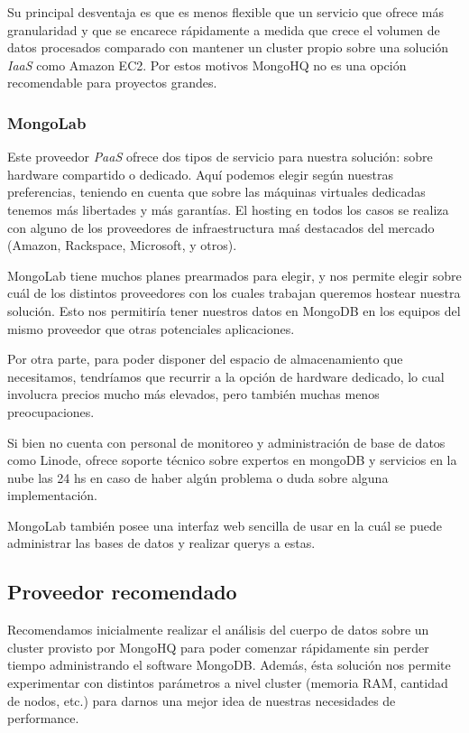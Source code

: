 \documentclass[a4paper,10pt,twoside]{article}
\begin{document}
Su principal desventaja es que es menos flexible que un servicio que ofrece más granularidad y que se encarece rápidamente a medida que crece el volumen de datos procesados comparado con mantener un cluster propio sobre una solución \emph{IaaS} como Amazon EC2. Por estos motivos MongoHQ no es una opción recomendable para proyectos grandes.


\subsubsection{MongoLab}

Este proveedor \emph{PaaS} ofrece dos tipos de servicio para nuestra solución: sobre hardware compartido o dedicado. Aquí podemos elegir según nuestras preferencias, teniendo en cuenta que sobre las máquinas virtuales dedicadas tenemos más libertades y más garantías. El hosting en todos los casos se realiza con alguno de los proveedores de infraestructura maś destacados del mercado (Amazon, Rackspace, Microsoft, y otros).

MongoLab tiene muchos planes prearmados para elegir, y nos permite elegir sobre cuál de los distintos proveedores con los cuales trabajan queremos hostear nuestra solución. Esto nos permitiría tener nuestros datos en MongoDB en los equipos del mismo proveedor que otras potenciales aplicaciones.

Por otra parte, para poder disponer del espacio de almacenamiento que necesitamos, tendríamos que recurrir a la opción de hardware dedicado, lo cual involucra precios mucho más elevados, pero también muchas menos preocupaciones.

Si bien no cuenta con personal de monitoreo y administración de base de datos como Linode, ofrece soporte técnico sobre expertos en mongoDB y servicios en la nube las 24 hs en caso de haber algún problema o duda sobre alguna implementación.

MongoLab también posee una interfaz web sencilla de usar en la cuál se puede administrar las bases de datos y realizar querys a estas.


\subsection{Proveedor recomendado}

Recomendamos inicialmente realizar el análisis del cuerpo de datos sobre un cluster provisto por MongoHQ para poder comenzar rápidamente sin perder tiempo administrando el software MongoDB. Además, ésta solución nos permite experimentar con distintos parámetros a nivel cluster (memoria RAM, cantidad de nodos, etc.) para darnos una mejor idea de nuestras necesidades de performance.
\end{document}
